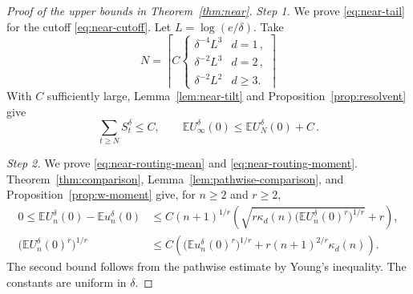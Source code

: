 \documentclass[11pt]{amsart}
\theoremstyle{plain}
\theoremstyle{definition}
\newcommand{\E}{\mathbb{E}}
\begin{document}
\begin{proof}[Proof of the upper bounds in Theorem~\ref{thm:near}]
	\smallskip
	\noindent\emph{Step 1.} We prove \eqref{eq:near-tail} for the cutoff
	\eqref{eq:near-cutoff}.
	Let $L=\log(e/\delta)$. Take
	\begin{equation}\label{eq:near-cutoff}
		N=\left\lceil C
		\begin{cases}
			\delta^{-4}L^3&d=1\,,\\
			\delta^{-2}L^3&d=2\,,\\
			\delta^{-2}L^2&d\geq3.
		\end{cases}\right\rceil
	\end{equation}
	With $C$ sufficiently large, Lemma~\ref{lem:near-tilt} and
	Proposition~\ref{prop:resolvent} give
	\begin{equation}\label{eq:near-tail}
		\sum_{t\geq N}S_t^\delta\leq C,
		\qquad \E U_\infty^\delta(0)\leq\E U_N^\delta(0)+C\,.
	\end{equation}

	\smallskip
	\noindent\emph{Step 2.} We prove \eqref{eq:near-routing-mean} and
	\eqref{eq:near-routing-moment}.
	Theorem~\ref{thm:comparison}, Lemma~\ref{lem:pathwise-comparison}, and
	Proposition~\ref{prop:w-moment} give, for $n\geq2$ and $r\geq2$,
	\begin{align}
		0\leq\E U_n^\delta(0)-\E u_n^\delta(0)
		&\leq C(n+1)^{1/r}
		\left(\sqrt{r\kappa_d(n)\bigl(\E U_n^\delta(0)^r\bigr)^{1/r}}+r\right),
		\label{eq:near-routing-mean}\\
		\bigl(\E U_n^\delta(0)^r\bigr)^{1/r}
		&\leq C\left(\bigl(\E u_n^\delta(0)^r\bigr)^{1/r}
		+r(n+1)^{2/r}\kappa_d(n)\right).
		\label{eq:near-routing-moment}
	\end{align}
	The second bound follows from the pathwise estimate by Young's inequality.
	The constants are uniform in $\delta$.


\end{proof}
\end{document}
